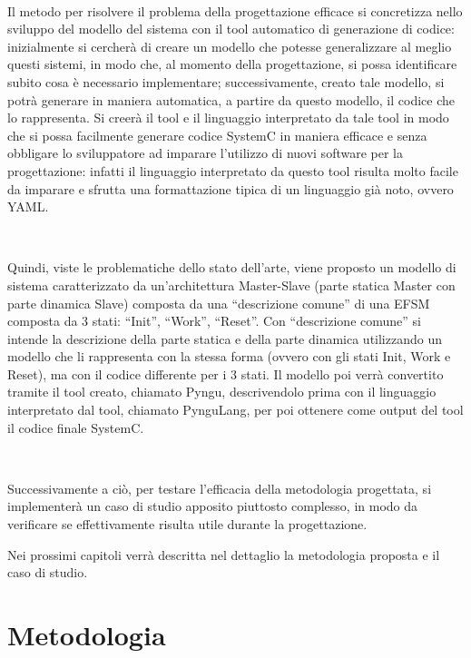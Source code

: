 \documentclass[a4paper,titlepage]{book}
\begin{document}
~ 

Il metodo per risolvere il problema della progettazione efficace si concretizza nello sviluppo del modello del sistema con il tool automatico di generazione di codice: inizialmente si cercherà di creare un modello che potesse generalizzare al meglio questi sistemi, in modo che, al momento della progettazione, si possa identificare subito cosa è necessario implementare; successivamente, creato tale modello, si potrà generare in maniera automatica, a partire da questo modello, il codice che lo rappresenta.  Si creerà il tool e il linguaggio interpretato da tale tool in modo che si possa facilmente generare codice SystemC in maniera efficace e senza obbligare lo sviluppatore ad imparare l'utilizzo di nuovi software per la progettazione: infatti il linguaggio interpretato da questo tool risulta molto facile da imparare e sfrutta una formattazione tipica di un linguaggio già noto, ovvero YAML.

~ 

Quindi, viste le problematiche dello stato dell’arte, viene proposto un modello di sistema caratterizzato da un'architettura Master-Slave (parte statica Master con parte dinamica Slave) composta da una ``descrizione comune'' di una EFSM composta da 3 stati: ``Init'', ``Work'', ``Reset''. Con ``descrizione comune'' si intende la descrizione della parte statica e della parte dinamica utilizzando un modello che li rappresenta con la stessa forma (ovvero con gli stati Init, Work e Reset), ma con il codice differente per i 3 stati. Il modello poi verrà convertito tramite il tool creato, chiamato Pyngu, descrivendolo prima con il linguaggio interpretato dal tool, chiamato PynguLang, per poi ottenere come output del tool il codice finale SystemC.

~ 

Successivamente a ciò, per testare l'efficacia della metodologia progettata, si implementerà un caso di studio apposito piuttosto complesso, in modo da verificare se effettivamente risulta utile durante la progettazione. 
~ 

Nei prossimi capitoli verrà descritta nel dettaglio la metodologia proposta e il caso di studio.

\chapter{Metodologia}
\end{document}
